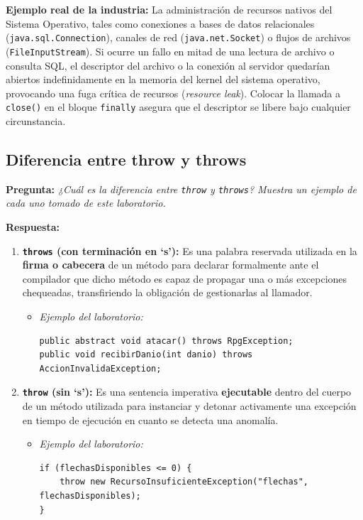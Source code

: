 \documentclass[11pt,letterpaper]{article}
\begin{document}
\textbf{Ejemplo real de la industria:} La administración de recursos nativos del Sistema Operativo, tales como conexiones a bases de datos relacionales (\texttt{java.sql.Connection}), canales de red (\texttt{java.net.Socket}) o flujos de archivos (\texttt{FileInputStream}). Si ocurre un fallo en mitad de una lectura de archivo o consulta SQL, el descriptor del archivo o la conexión al servidor quedarían abiertos indefinidamente en la memoria del kernel del sistema operativo, provocando una fuga crítica de recursos (\textit{resource leak}). Colocar la llamada a \texttt{close()} en el bloque \texttt{finally} asegura que el descriptor se libere bajo cualquier circunstancia.

\subsection{Diferencia entre throw y throws}
\textbf{Pregunta:} \textit{¿Cuál es la diferencia entre \texttt{throw} y \texttt{throws}? Muestra un ejemplo de cada uno tomado de este laboratorio.}

\vspace{0.2cm}
\noindent \textbf{Respuesta:}
\begin{enumerate}
    \item \textbf{\texttt{throws} (con terminación en `s'):} Es una palabra reservada utilizada en la \textbf{firma o cabecera} de un método para declarar formalmente ante el compilador que dicho método es capaz de propagar una o más excepciones chequeadas, transfiriendo la obligación de gestionarlas al llamador.
    \begin{itemize}
        \item \textit{Ejemplo del laboratorio:}
        \begin{lstlisting}[style=JavaStyle,numbers=none]
public abstract void atacar() throws RpgException;
public void recibirDanio(int danio) throws AccionInvalidaException;
        \end{lstlisting}
    \end{itemize}
    \item \textbf{\texttt{throw} (sin `s'):} Es una sentencia imperativa \textbf{ejecutable} dentro del cuerpo de un método utilizada para instanciar y detonar activamente una excepción en tiempo de ejecución en cuanto se detecta una anomalía.
    \begin{itemize}
        \item \textit{Ejemplo del laboratorio:}
        \begin{lstlisting}[style=JavaStyle,numbers=none]
if (flechasDisponibles <= 0) {
    throw new RecursoInsuficienteException("flechas", flechasDisponibles);
}
        \end{lstlisting}
    \end{itemize}
\end{enumerate}
\end{document}
